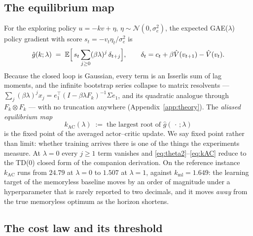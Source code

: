 \subsection{The equilibrium map}

For the exploring policy $u = -kv + \eta$, $\eta\sim\mathcal N(0,\sigma_e^2)$,
the expected GAE($\lambda$) policy gradient with score
$s_t = -v_t\eta_t/\sigma_e^2$ is
\begin{equation}
\hat g(k;\lambda) \;=\; \mathbb{E}\Bigl[\, s_t \sum_{j\ge 0} (\beta\lambda)^j\,\delta_{t+j} \Bigr],
\qquad
\delta_t = c_t + \beta \hat V(v_{t+1}) - \hat V(v_t).
\label{eq:ghat}
\end{equation}
Because the closed loop is Gaussian, every term is an Isserlis sum of lag
moments, and the infinite bootstrap series collapse to matrix resolvents ---
$\sum_j (\beta\lambda)^j x_j = e_1^\top (I - \beta\lambda F_k)^{-1}\Sigma e_1$,
and its quadratic analogue through $F_k\!\otimes\!F_k$ --- with no truncation
anywhere (Appendix~\ref{app:theory}). The \emph{aliased equilibrium map}
\begin{equation}
k_{\mathrm{AC}}(\lambda) \;:=\; \text{the largest root of } \hat g(\,\cdot\,;\lambda)
\label{eq:kAC}
\end{equation}
is the fixed point of the averaged actor--critic update. We say fixed point
rather than limit: whether training arrives there is one of the things the
experiments measure. At $\lambda = 0$ every $j\ge1$ term vanishes and
\eqref{eq:theta2}--\eqref{eq:kAC} reduce to the TD(0) closed form of the
companion derivation. On the reference instance $k_{\mathrm{AC}}$ runs from
$24.79$ at $\lambda=0$ to $1.507$ at $\lambda=1$, against
$k_{\mathrm{ml}} = 1.649$: the learning target of the memoryless baseline moves
by an order of magnitude under a hyperparameter that is rarely reported to two
decimals, and it moves \emph{away} from the true memoryless optimum as the
horizon shortens.

\subsection{The cost law and its threshold}

